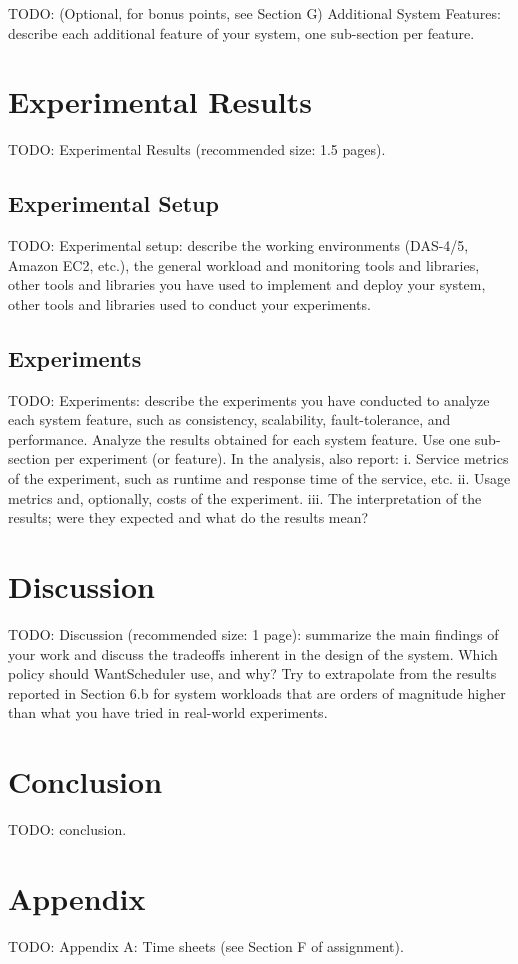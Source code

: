 \documentclass{scrartcl}
\begin{document}
TODO: (Optional, for bonus points, see Section G) Additional System Features:
describe each additional feature of your system, one sub-section per feature.



\section{Experimental Results} \label{sec_results}

TODO: Experimental Results (recommended size: 1.5 pages).


\subsection{Experimental Setup} \label{sec_setup}

TODO: Experimental setup: describe the working environments (DAS-4/5, Amazon
EC2, etc.), the general workload and monitoring tools and libraries, other tools
and libraries you have used to implement and deploy your system, other tools and
libraries used to conduct your experiments.


\subsection{Experiments} \label{sec_experiments}

TODO: Experiments: describe the experiments you have conducted to analyze each
	  system feature, such as consistency, scalability, fault-tolerance, and
	  performance. Analyze the results obtained for each system feature. Use one
	  sub-section per experiment (or feature). In the analysis, also report:
        i.   Service metrics of the experiment, such as runtime and response time of the
             service, etc.
        ii.  Usage metrics and, optionally, costs of the experiment.
        iii. The interpretation of the results; were they expected and what do
             the results mean?



\section{Discussion} \label{sec_discussion}

TODO: Discussion (recommended size: 1 page): summarize the main findings of your
work and discuss the tradeoffs inherent in the design of the system. Which
policy should WantScheduler use, and why? Try to extrapolate from the results
reported in Section 6.b for system workloads that are orders of magnitude higher
than what you have tried in real-world experiments.



\section{Conclusion} \label{sec_conclusion}

TODO: conclusion.


\appendix


\section{Appendix}

TODO: Appendix A: Time sheets (see Section F of assignment).

\end{document}
